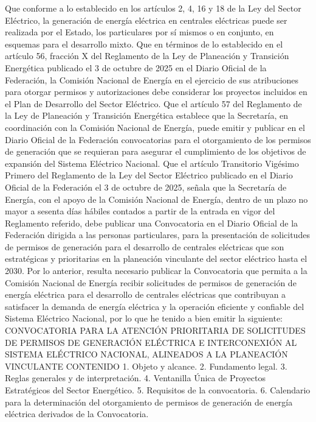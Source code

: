 Que conforme a lo establecido en los artículos 2, 4, 16 y 18 de la Ley del Sector Eléctrico, la generación de energía eléctrica en centrales eléctricas puede ser realizada por el Estado, los particulares por sí mismos o en conjunto, en esquemas para el desarrollo mixto.
Que en términos de lo establecido en el artículo 56, fracción X del Reglamento de la Ley de Planeación y Transición Energética publicado el 3 de octubre de 2025 en el Diario Oficial de la Federación, la Comisión Nacional de Energía en el ejercicio de sus atribuciones para otorgar permisos y autorizaciones debe considerar los proyectos incluidos en el Plan de Desarrollo del Sector Eléctrico.
Que el artículo 57 del Reglamento de la Ley de Planeación y Transición Energética establece que la Secretaría, en coordinación con la Comisión Nacional de Energía, puede emitir y publicar en el Diario Oficial de la Federación convocatorias para el otorgamiento de los permisos de generación que se requieran para asegurar el cumplimiento de los objetivos de expansión del Sistema Eléctrico Nacional.
Que el artículo Transitorio Vigésimo Primero del Reglamento de la Ley del Sector Eléctrico publicado en el Diario Oficial de la Federación el 3 de octubre de 2025, señala que la Secretaría de Energía, con el apoyo de la Comisión Nacional de Energía, dentro de un plazo no mayor a sesenta días hábiles contados a partir de la entrada en vigor del Reglamento referido, debe publicar una Convocatoria en el Diario Oficial de la Federación dirigida a las personas particulares, para la presentación de solicitudes de permisos de generación para el desarrollo de centrales eléctricas que son estratégicas y prioritarias en la planeación vinculante del sector eléctrico hasta el 2030.
Por lo anterior, resulta necesario publicar la Convocatoria que permita a la Comisión Nacional de Energía recibir solicitudes de permisos de generación de energía eléctrica para el desarrollo de centrales eléctricas que contribuyan a satisfacer la demanda de energía eléctrica y la operación eficiente y confiable del Sistema Eléctrico Nacional, por lo que he tenido a bien emitir la siguiente:
CONVOCATORIA PARA LA ATENCIÓN PRIORITARIA DE SOLICITUDES DE PERMISOS DE GENERACIÓN ELÉCTRICA E INTERCONEXIÓN AL SISTEMA ELÉCTRICO NACIONAL, ALINEADOS A LA PLANEACIÓN VINCULANTE
CONTENIDO
1.	Objeto y alcance.
2.	Fundamento legal.
3.	Reglas generales y de interpretación.
4.	Ventanilla Única de Proyectos Estratégicos del Sector Energético.
5.	Requisitos de la convocatoria.
6.	Calendario para la determinación del otorgamiento de permisos de generación de energía eléctrica derivados de la Convocatoria.
